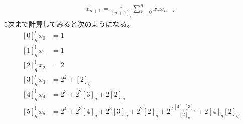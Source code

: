 {\begin{equation*}
\begin{split}
		x_{n+1} = \frac{1}{[n+1]_q^!}\sum_{r=0}^n x_rx_{n-r}
	\end{split}\end{equation*}
	$5$次まで計算してみると次のようになる。
	\begin{equation*}\begin{split}
		[0]_q^!\, x_0 &= 1 \\
		[1]_q^!\, x_1 &= 1 \\
		[2]_q^!\, x_2 &= 2 \\
		[3]_q^!\, x_3 &= 2^2 + [2]_q \\
		[4]_q^!\, x_4 &= 2^3 + 2^2[3]_q + 2[2]_q \\
		[5]_q^!\, x_5 &= 2^4 + 2^3[4]_q + 2^3[3]_q + 2^2[2]_q 
			+ 2^2\frac{[4]_q[3]_q}{[2]_q} + 2[4]_q[2]_q \\
	\end{split}\end{equation*}
}
